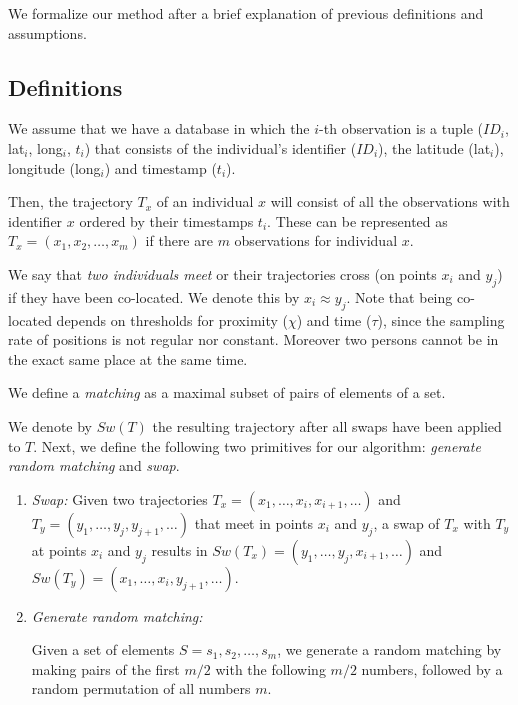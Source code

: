 \documentclass[]{llncs}
\begin{document}
We formalize our method after a brief explanation of previous definitions and assumptions.

\subsection{Definitions}
We assume that we have a database in which the $i$-th observation is a tuple ($ID_i$, lat$_i$, long$_i$, $t_i$) that
consists of the individual's identifier ($ID_i$), the latitude (lat$_i$), longitude (long$_i$) and timestamp ($t_i$).

Then, the trajectory $T_x$ of an individual \texttt{$x$} will consist of all the observations with identifier \texttt{$x$} ordered by their timestamps \texttt{$t_i$}.
These can be represented as $T_x = (x_1, x_2, \ldots, x_m)$ if there are $m$ observations for individual $x$.


We say that \emph{two individuals meet} or their trajectories cross (on points $x_i$ and $y_j$) if they have been co-located. We denote this by $x_i \approx y_j$. Note that being co-located depends on thresholds for proximity ($\chi$) and time ($\tau$), since the sampling rate of positions is not regular nor constant. Moreover two persons cannot be in the exact same place at the same time.

We define a \emph{matching} as a maximal subset of pairs of elements of a set.

We denote by $Sw(T)$ the resulting trajectory after all swaps have been applied to $T$.
Next, we define the following two primitives for our algorithm: \emph{generate random matching} and \emph{swap}.
\begin{enumerate}

\item \emph{Swap:}
Given two trajectories $T_x = (x_1, \ldots, x_i, x_{i+1}, \ldots)$ and \linebreak
$T_y= (y_1, \ldots, y_j, y_{j+1}, \ldots)$ that meet in points $x_i$ and $y_j$, a swap of $T_x$ with $T_y$ at points $x_i$ and $y_j$ results in $Sw(T_x) = (y_1, \ldots, y_j, x_{i+1}, \ldots)$ and 
\linebreak
$Sw(T_y)= (x_1, \ldots, x_i, y_{j+1}, \ldots)$.
\item \emph{Generate random matching:} 

Given a set of elements $S = s_1, s_2,\ldots, s_m$, we generate a random matching by making pairs of the first $m/2$ with the following $m/2$ numbers, followed by a random permutation of all numbers $m$.
\end{enumerate}
\end{document}
